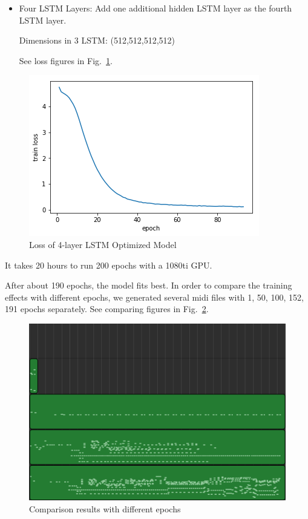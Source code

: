 \documentclass[conference]{IEEEtran}
\begin{document}
\begin{itemize}
\item Four LSTM Layers: Add one additional hidden LSTM layer as the fourth LSTM layer. 

Dimensions in 3 LSTM: (512,512,512,512)

See loss figures in Fig.~\ref{fig3}.
\end{itemize}

\begin{figure}[htbp]
\centerline{\includegraphics[scale=0.6]{log_4lstm.png}}
\caption{Loss of 4-layer LSTM Optimized Model}
\label{fig3}
\end{figure}


It takes 20 hours to run 200 epochs with a 1080ti GPU.

After about 190 epochs, the model fits best.
In order to compare the training effects with different epochs, we generated several midi files with 1, 50, 100, 152, 191 epochs separately. See comparing figures in Fig.~\ref{fig4}.

\begin{figure}[htbp]
\centerline{\includegraphics[scale=0.45]{compare_results.png}}
\caption{Comparison results with different epochs\protect\footnotemark}
\label{fig4}
\end{figure}
\end{document}
